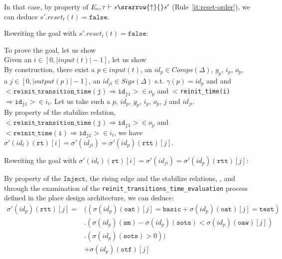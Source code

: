 \documentclass[dvipsnames,12pt]{article}
\begin{document}
\begin{niproof}
\begin{itemize}
\begin{itemize}
\begin{itemize}
        In that case, by property of
        $E_c,\tau\vdash{}s\srarrow{\uparrow}{\fontsize{7}{7}\selectfont}s'$
        (Rule~\ref{it:reset-order}), we can deduce
        $s'.reset_t(t)=\mathtt{false}$.
        
        Rewriting the goal with $s'.reset_t(t)=\mathtt{false}$:

        To prove the goal, let us show
        \\

        Given an $i\in[0,\vert{}input(t)\vert-1]$, let us show
        \\

        By construction, there exist a $p\in{}input(t)$, an
        $id_p\in{}Comps(\Delta)$, $g_p$, $i_p$, $o_p$, \\ a
        $j\in[0,\vert{}output(p)\vert-1]$, an
        $id_{ji}\in{}Sigs(\Delta)$ s.t. $\gamma(p)=id_p$ and
        \InCsCompP{} and
        ${<}\mathtt{reinit\_transition\_time(j)\Rightarrow{}id_{ji}}{>}\in{}o_p$
        and
        ${<}$\texttt{reinit\_time(i)}$\Rightarrow{}\mathtt{id_{ji}}{>}\in{}i_t$. Let
        us take such a $p$, $id_p$, $g_p$, $i_p$, $o_p$, $j$ and
        $id_{ji}$.\\

        By property of the stabilize relation,
        ${<}\mathtt{reinit\_transition\_time(j)\Rightarrow{}id_{ji}}{>}\in{}o_p$
        and
        ${<}\mathtt{reinit\_time(i)\Rightarrow{}id_{ji}}{>}\in{}i_t$,
        we have
        $\sigma'(id_t)(\texttt{rt})[i]=\sigma'(id_{ji})=\sigma'(id_p)(\texttt{rtt})[j]$.

        Rewriting the goal with
        $\sigma'(id_t)(\texttt{rt})[i]=\sigma'(id_{ji})=\sigma'(id_p)(\texttt{rtt})[j]$:\\

        By property of the $\mathtt{Inject}$, the \hvhdl{}
        rising edge and the stabilize relations, \InCsCompP, and
        through the examination of the
        \texttt{reinit_transitions_time_evaluation} process defined in
        the place design architecture, we can deduce:
        \begin{equation}
          \label{eq:10}
          \begin{split}
            \sigma'(id_p)(\texttt{rtt})[j]=& \big((\sigma(id_p)(\texttt{oat})[j]=\mathtt{basic}+\sigma(id_p)(\texttt{oat})[j]=\mathtt{test}) \\
            & .(\sigma(id_p)(\texttt{sm})-\sigma(id_p)(\texttt{sots})<\sigma(id_p)(\texttt{oaw})[j])\\
            & .(\sigma(id_p)(\texttt{sots})>0)\big)\\
            & +\sigma(id_p)(\texttt{otf})[j] \\
          \end{split}
        \end{equation}


\end{itemize}
\end{itemize}
\end{itemize}
\end{niproof}
\end{document}

